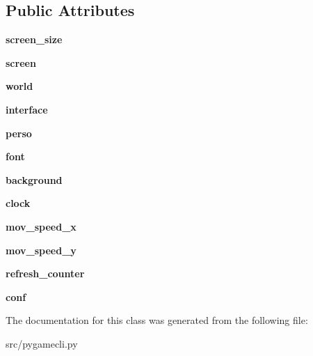 \subsection*{Public Attributes}
\begin{DoxyCompactItemize}
\item 
\hypertarget{classsrc_1_1pygamecli_1_1_client_a055195a715cdf33f61a51a45576465c4}{}\label{classsrc_1_1pygamecli_1_1_client_a055195a715cdf33f61a51a45576465c4} 
{\bfseries screen\+\_\+size}
\item 
\hypertarget{classsrc_1_1pygamecli_1_1_client_abd74a69bc51c1dbfd1cb9758a616f169}{}\label{classsrc_1_1pygamecli_1_1_client_abd74a69bc51c1dbfd1cb9758a616f169} 
{\bfseries screen}
\item 
\hypertarget{classsrc_1_1pygamecli_1_1_client_a8eedf3dd956cbda87e89c36382bdb7e5}{}\label{classsrc_1_1pygamecli_1_1_client_a8eedf3dd956cbda87e89c36382bdb7e5} 
{\bfseries world}
\item 
\hypertarget{classsrc_1_1pygamecli_1_1_client_a2505375869f2d55692ffd7568f9f8619}{}\label{classsrc_1_1pygamecli_1_1_client_a2505375869f2d55692ffd7568f9f8619} 
{\bfseries interface}
\item 
\hypertarget{classsrc_1_1pygamecli_1_1_client_a2de426209a1bfad65e0a6e0a46303c33}{}\label{classsrc_1_1pygamecli_1_1_client_a2de426209a1bfad65e0a6e0a46303c33} 
{\bfseries perso}
\item 
\hypertarget{classsrc_1_1pygamecli_1_1_client_a39f2cef91681eb0bf1f8252da503b058}{}\label{classsrc_1_1pygamecli_1_1_client_a39f2cef91681eb0bf1f8252da503b058} 
{\bfseries font}
\item 
\hypertarget{classsrc_1_1pygamecli_1_1_client_a9ec2972091b06b16117f0baa1d65278b}{}\label{classsrc_1_1pygamecli_1_1_client_a9ec2972091b06b16117f0baa1d65278b} 
{\bfseries background}
\item 
\hypertarget{classsrc_1_1pygamecli_1_1_client_aee011dd1c065c881f1d6a0da5016dde4}{}\label{classsrc_1_1pygamecli_1_1_client_aee011dd1c065c881f1d6a0da5016dde4} 
{\bfseries clock}
\item 
\hypertarget{classsrc_1_1pygamecli_1_1_client_a81f50008645e5e8e7136fb91530b56ce}{}\label{classsrc_1_1pygamecli_1_1_client_a81f50008645e5e8e7136fb91530b56ce} 
{\bfseries mov\+\_\+speed\+\_\+x}
\item 
\hypertarget{classsrc_1_1pygamecli_1_1_client_a2836ea81c20a492021830e2b8aee50f2}{}\label{classsrc_1_1pygamecli_1_1_client_a2836ea81c20a492021830e2b8aee50f2} 
{\bfseries mov\+\_\+speed\+\_\+y}
\item 
\hypertarget{classsrc_1_1pygamecli_1_1_client_a1db51662d1392a57cd96ae0d2030d78d}{}\label{classsrc_1_1pygamecli_1_1_client_a1db51662d1392a57cd96ae0d2030d78d} 
{\bfseries refresh\+\_\+counter}
\item 
\hypertarget{classsrc_1_1pygamecli_1_1_client_a6b36ebb195e6f899ef039dc5b09bb224}{}\label{classsrc_1_1pygamecli_1_1_client_a6b36ebb195e6f899ef039dc5b09bb224} 
{\bfseries conf}
\end{DoxyCompactItemize}


The documentation for this class was generated from the following file\+:\begin{DoxyCompactItemize}
\item 
src/pygamecli.\+py\end{DoxyCompactItemize}

